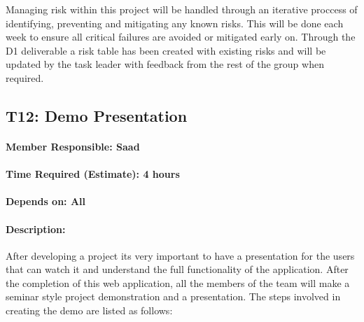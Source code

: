 \documentclass[
  paper=a4,
  ,captions=tableheading
]{scrartcl}
\begin{document}
Managing risk within this project will be handled through an iterative
proccess of identifying, preventing and mitigating any known risks. This
will be done each week to ensure all critical failures are avoided or
mitigated early on. Through the D1 deliverable a risk table has been
created with existing risks and will be updated by the task leader with
feedback from the rest of the group when required.

\newpage
\hypertarget{t12-demo-presentation}{%
\subsection{T12: Demo Presentation}\label{t12-demo-presentation}}

\hypertarget{member-responsible-saad}{%
\paragraph{Member Responsible: Saad}\label{member-responsible-saad}}

\hypertarget{time-required-estimate-4-hours}{%
\paragraph{Time Required (Estimate): 4
hours}\label{time-required-estimate-4-hours}}

\hypertarget{depends-on-all-2}{%
\paragraph{Depends on: All}\label{depends-on-all-2}}

\hypertarget{description-10}{%
\paragraph{Description:}\label{description-10}}

After developing a project its very important to have a presentation for
the users that can watch it and understand the full functionality of the
application. After the completion of this web application, all the
members of the team will make a seminar style project demonstration and
a presentation. The steps involved in creating the demo are listed as
follows:
\end{document}

